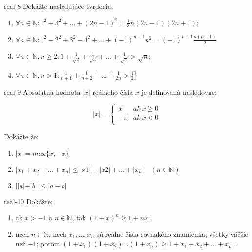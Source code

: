 \begin{defproblem}{real-8}
Dokážte nasledujúce tvrdenia:
 
\begin{enumerate}
  \item $\forall n \in \mathbb{N}: 1^2 + 3^2 + \ldots + (2n - 1)^2 =
         \frac{1}{3} n(2n - 1)(2n + 1)$;
  \item $\forall n \in \mathbb{N}: 1^2 - 2^2 + 3^2 - 4^2 + \ldots +
         (-1)^{n-1}n^2 = (-1)^{n-1}\frac{n(n + 1)}{2}$
  \item $\forall n \in \mathbb{N}, n \geq 2: 1 + \frac{1}{\sqrt{2}} +
         \frac{1}{\sqrt{3}} + \ldots + \frac{1}{\sqrt{n}} > \sqrt{n}$;
  \item $\forall n \in \mathbb{N}, n > 1: \frac{1}{n+1} + \frac{1}{n+2} +
         \ldots + \frac{1}{2n} > \frac{13}{24}$
\end{enumerate}
\end{defproblem}

\begin{defproblem}{real-9}
Absolútna hodnota $|x|$ reálneho čísla $x$ je definovaná nasledovne:

\[   |x| = \left\{
\begin{array}{ll}
  x & ak~x \geq 0 \\
  -x & ak~x < 0 \\
\end{array} 
\right. \]

Dokážte že:

\begin{enumerate}
  \item $|x| = max\{x, -x\}$
  \item $|x_1 + x_2 + \ldots + x_n| \leq |x1| + |x2| + \ldots + |x_n| \quad (n \in \mathbb{N})$
  \item $||a| - |b|| \leq |a - b|$
\end{enumerate}

\end{defproblem}

\begin{defproblem}{real-10}
Dokážte:

\begin{enumerate}
  \item ak $x > -1$ a $n \in \mathbb{N}$, tak $(1 + x)^n \geq 1 + nx$ ;
  \item nech $n \in \mathbb{N}$, nech $x_1, \ldots, x_n$ sú reálne čísla
        rovnakého znamienka, všetky väčšie než $-1$; potom
        $(1 + x_1)(1 + x_2) \ldots (1 + x_n) \geq 1 + x_1 + x_2 + \ldots + x_n$ .
\end{enumerate}
\end{defproblem}

